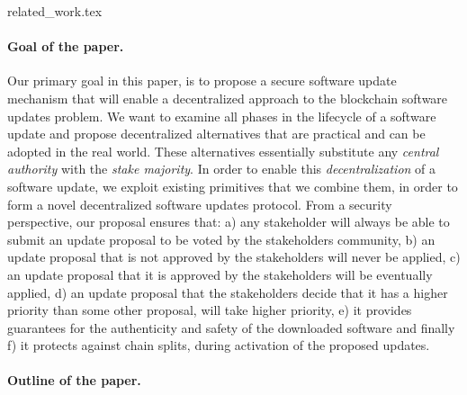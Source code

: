 
{related_work.tex}

\paragraph{Goal of the paper.} Our primary goal in this paper, is to propose a secure software update mechanism that will enable a decentralized approach to the blockchain software updates problem. We want to examine all phases in the lifecycle of a software update and propose decentralized alternatives that are practical and can be adopted in the real world. These alternatives essentially substitute any \emph{central authority} with the \emph{stake majority}. In order to enable this \emph{decentralization} of a software update, we exploit existing primitives that we combine them, in order to form a novel decentralized software updates protocol. From a security perspective, our proposal ensures that:
a) any stakeholder will always be able to submit an update proposal to be voted by the stakeholders community, b) an update proposal that is not approved by the stakeholders 
 will never be applied, c) an update proposal that it is approved by the stakeholders will be eventually applied, d) an update proposal that the stakeholders decide that it has a higher priority than some other proposal, will take higher priority, e) it provides guarantees for the authenticity and safety of the downloaded software and finally f) it protects against chain splits, during activation of the proposed updates.

\paragraph{Outline of the paper.}
